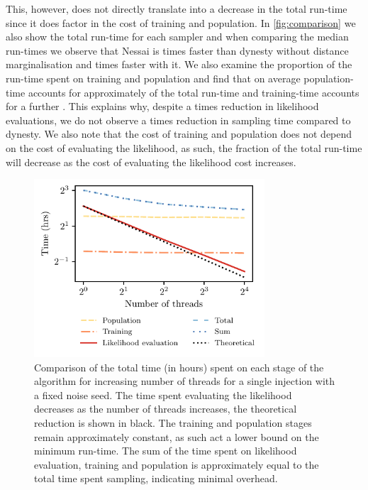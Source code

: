 \documentclass[%
 reprint,
nofootinbib,
 amsmath,amssymb,
 aps,
 prd,
]{revtex4-2}
\newcommand{\nessai}{{\sc Nessai}\xspace}
\newcommand{\dynesty}{{\sc dynesty}\xspace}
\newcommand{\figwidth}{8.6cm}
\begin{document}
This, however, does not directly translate into a decrease in the total run-time since it does factor in the cost of training and population. In \cref{fig:comparison} we also show the total run-time for each sampler and when comparing the median run-times we observe that \nessai is \timeratio times faster than \dynesty without distance marginalisation and \timeratiomarg times faster with it. We also examine the proportion of the run-time spent on training and population and find that on average population-time accounts for approximately \populationtime of the total run-time and training-time accounts for a further \trainingtime. This explains why, despite a \evaluationsratio times reduction in likelihood evaluations, we do not observe a \evaluationsratio times reduction in sampling time compared to \dynesty. We also note that the cost of training and population does not depend on the cost of evaluating the likelihood, as such, the fraction of the total run-time will decrease as the cost of evaluating the likelihood cost increases.

\begin{figure}
    \centering
    \includegraphics[width=\figwidth]{figures/multithreading.pdf}
    \caption{Comparison of the total time (in hours) spent on each stage of the algorithm for increasing number of threads for a single injection with a fixed noise seed. The time spent evaluating the likelihood decreases as the number of threads increases, the theoretical reduction is shown in black. The training and population stages remain approximately constant, as such act a lower bound on the minimum run-time. The sum of the time spent on likelihood evaluation, training and population is approximately equal to the total time spent sampling, indicating minimal overhead.}
    \label{fig:multithreading}
\end{figure}
\end{document}
